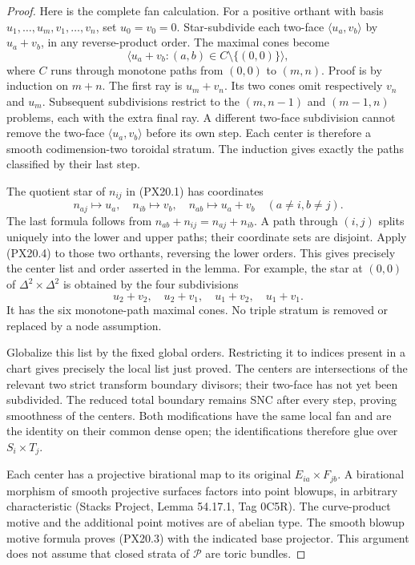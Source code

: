 \begin{proof}
Here is the complete fan calculation. For a positive orthant with
basis $u_1,\ldots,u_m,v_1,\ldots,v_n$, set $u_0=v_0=0$.
Star-subdivide each two-face $\langle u_a,v_b\rangle$ by
$u_a+v_b$, in any reverse-product order. The maximal cones become
\[
 \langle u_a+v_b:(a,b)\in C\setminus\{(0,0)\}\rangle,
 \tag{PX20.4}
\]
where $C$ runs through monotone paths from $(0,0)$ to $(m,n)$.
Proof is by induction on $m+n$. The first ray is $u_m+v_n$.
Its two cones omit respectively $v_n$ and $u_m$. Subsequent
subdivisions restrict to the $(m,n-1)$ and $(m-1,n)$ problems,
each with the extra final ray. A different two-face subdivision
cannot remove the two-face $\langle u_a,v_b\rangle$ before its
own step. Each center is therefore a smooth codimension-two
toroidal stratum. The induction gives exactly the paths classified
by their last step.

The quotient star of $n_{ij}$ in (PX20.1) has coordinates
\[
 n_{aj}\mapsto u_a,\quad n_{ib}\mapsto v_b,\quad
 n_{ab}\mapsto u_a+v_b\quad(a\ne i,b\ne j).
 \tag{PX20.5}
\]
The last formula follows from
$n_{ab}+n_{ij}=n_{aj}+n_{ib}$. A path through $(i,j)$ splits
uniquely into the lower and upper paths; their coordinate sets are
disjoint. Apply (PX20.4) to those two orthants, reversing the lower
orders. This gives precisely the center list and order asserted in
the lemma. For example, the star at $(0,0)$ of
$\Delta^2\times\Delta^2$ is obtained by the four subdivisions
\[
 u_2+v_2,\quad u_2+v_1,\quad u_1+v_2,\quad u_1+v_1.
 \tag{PX20.6}
\]
It has the six monotone-path maximal cones. No triple stratum is
removed or replaced by a node assumption.

Globalize this list by the fixed global orders. Restricting it to
indices present in a chart gives precisely the local list just
proved. The centers are intersections of the relevant two strict
transform boundary divisors; their two-face has not yet been
subdivided. The reduced total boundary remains SNC after every
step, proving smoothness of the centers. Both modifications have
the same local fan and are the identity on their common dense open;
the identifications therefore glue over $S_i\times T_j$.

Each center has a projective birational map to its original
$E_{ia}\times F_{jb}$. A birational morphism of smooth projective
surfaces factors into point blowups, in arbitrary characteristic
(Stacks Project, Lemma 54.17.1, Tag 0C5R).
The curve-product motive and the additional point motives are of
abelian type. The smooth blowup motive formula proves (PX20.3)
with the indicated base projector. This argument does not assume
that closed strata of $\mathcal P$ are toric bundles.
\end{proof}

